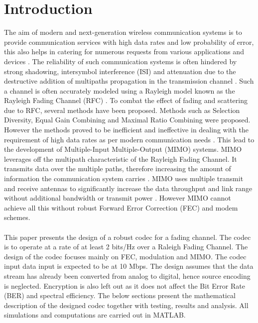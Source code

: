 \documentclass[11pt]{report}
\begin{document}
		
\begin{abstract}
\end{abstract}

\tableofcontents

\newpage

\section{Introduction}
The aim of modern and next-generation wireless communication systems is to provide communication services with high data rates and low probability of error, this also helps in catering for numerous requests from various applications and devices \cite{36,14,49}. The reliability of such communication systems is often hindered by strong shadowing, intersymbol interference (ISI) and attenuation due to the destructive addition of multipaths propagation in the transmission channel \cite{36,32}. Such a channel is often accurately modeled using a Rayleigh model known as the Rayleigh Fading Channel (RFC) \cite{32}. To combat the effect of fading and scattering due to RFC, several methods have been proposed. Methods such as Selection Diversity, Equal Gain Combining and Maximal Ratio Combining were proposed. However the methods proved to be inefficient and ineffective in dealing with the requirement of high data rates as per modern communication needs \cite{B8}. This lead to the development of Multiple-Input Multiple-Output (MIMO) systems. MIMO leverages off the multipath characteristic of the Rayleigh Fading Channel. It transmits data over the multiple paths, therefore increasing the amount of information the communication system carries \cite{50}. MIMO uses multiple transmit and receive antennas to significantly increase the data throughput and link range without additional bandwidth or transmit power \cite{B6}. However MIMO cannot 
achieve all this without robust Forward Error Correction (FEC) and modem schemes. 
\\
\\
This paper presents the design of a robust codec for a fading channel. The codec is to operate at a rate of at least 2 bits/Hz over a Raleigh Fading Channel. The design of the codec focuses mainly on FEC, modulation and MIMO. The codec input data input is expected to be at 10 Mbps. The design assumes that the data stream has already been converted from analog to digital, hence source encoding is neglected. Encryption is also left out as it does not affect the Bit Error Rate (BER) and spectral efficiency. The below sections present the mathematical description of the designed codec together with testing, results and analysis. All simulations and computations are carried out in MATLAB.



\end{document}
